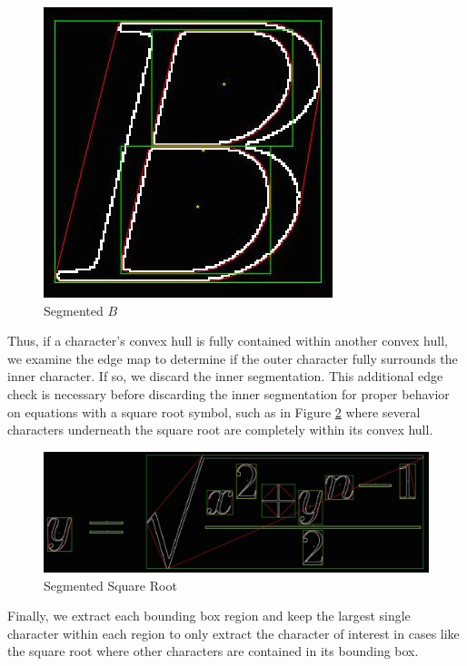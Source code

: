 \documentclass[journal]{IEEEtran}
\begin{document}
\begin{figure}[!t]
    \centering
    \includegraphics[width=\columnwidth]{B}
    \caption{Segmented $B$}
    \label{fig:B}
\end{figure}

Thus, if a character's convex hull is fully contained within another convex hull, we examine the edge map to determine if the outer character fully surrounds the inner character. If so, we discard the inner segmentation. This additional edge check is necessary before discarding the inner segmentation for proper behavior on equations with a square root symbol, such as in Figure \ref{fig:seg_eq} where several characters underneath the square root are completely within its convex hull. 

\begin{figure}[!t]
    \centering
    \includegraphics[width=\columnwidth]{seg_eq}
    \caption{Segmented Square Root}
    \label{fig:seg_eq}
\end{figure}
Finally, we extract each bounding box region and keep the largest single character within each region to only extract the character of interest in cases like the square root where other characters are contained in its bounding box.
\end{document}
